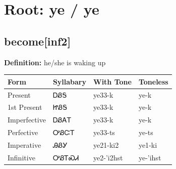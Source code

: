 \documentclass{article}%
\begin{document}
%
\normalsize%
\section*{Root: ye / ye}%
\subsection*{become[inf2]}%
\textbf{Definition: }%
he/she is waking up%
\\[0.5em]%
\begin{tabular}{|l|l|l|l|}%
\hline%
\textbf{Form}&\textbf{Syllabary}&\textbf{With Tone}&\textbf{Toneless}\\%
\hline%
Present&ᎠᏰᎦ&ye33{-}k&ye{-}k\\%
1st Present&ᏥᏰᎦ&ye33{-}k&ye{-}k\\%
Imperfective&ᎠᏰᎪᎢ&ye33{-}k&ye{-}k\\%
Perfective&ᎤᏰᏨᎢ&ye33{-}ts&ye{-}ts\\%
Imperative&ᎯᏰᎩ&ye21{-}ki2&ye1{-}ki\\%
Infinitive&ᎤᏰᎢᏍᏗ&ye2{-}'i2hst&ye{-}'ihst\\%
\hline%
\end{tabular}%
\\[1em]%
\end{document}
